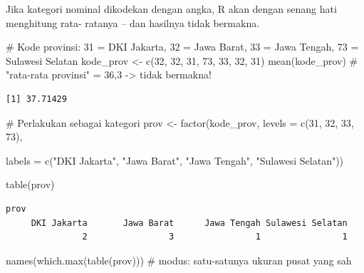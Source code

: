 \documentclass[
  indonesian,
  letterpaper,
]{book}
\newenvironment{Shaded}{\begin{snugshade}}{\end{snugshade}}
\newcommand{\AttributeTok}[1]{\textcolor[rgb]{0.40,0.45,0.13}{#1}}
\newcommand{\CommentTok}[1]{\textcolor[rgb]{0.37,0.37,0.37}{#1}}
\newcommand{\DecValTok}[1]{\textcolor[rgb]{0.68,0.00,0.00}{#1}}
\newcommand{\FunctionTok}[1]{\textcolor[rgb]{0.28,0.35,0.67}{#1}}
\newcommand{\NormalTok}[1]{\textcolor[rgb]{0.00,0.23,0.31}{#1}}
\newcommand{\OtherTok}[1]{\textcolor[rgb]{0.00,0.23,0.31}{#1}}
\newcommand{\StringTok}[1]{\textcolor[rgb]{0.13,0.47,0.30}{#1}}
\begin{document}
Jika kategori nominal dikodekan dengan angka, R akan dengan senang hati
menghitung rata- ratanya -- dan hasilnya tidak bermakna.

\begin{Shaded}
\begin{Highlighting}[]
\CommentTok{\# Kode provinsi: 31 = DKI Jakarta, 32 = Jawa Barat, 33 = Jawa Tengah, 73 = Sulawesi Selatan}
\NormalTok{kode\_prov }\OtherTok{\textless{}{-}} \FunctionTok{c}\NormalTok{(}\DecValTok{32}\NormalTok{, }\DecValTok{32}\NormalTok{, }\DecValTok{31}\NormalTok{, }\DecValTok{73}\NormalTok{, }\DecValTok{33}\NormalTok{, }\DecValTok{32}\NormalTok{, }\DecValTok{31}\NormalTok{)}
\FunctionTok{mean}\NormalTok{(kode\_prov) }\CommentTok{\# "rata{-}rata provinsi" = 36,3 {-}\textgreater{} tidak bermakna!}
\end{Highlighting}
\end{Shaded}

\begin{verbatim}
[1] 37.71429
\end{verbatim}

\begin{Shaded}
\begin{Highlighting}[]
\CommentTok{\# Perlakukan sebagai kategori}
\NormalTok{prov }\OtherTok{\textless{}{-}} \FunctionTok{factor}\NormalTok{(kode\_prov, }\AttributeTok{levels =} \FunctionTok{c}\NormalTok{(}\DecValTok{31}\NormalTok{, }\DecValTok{32}\NormalTok{, }\DecValTok{33}\NormalTok{, }\DecValTok{73}\NormalTok{),}

\AttributeTok{labels =} \FunctionTok{c}\NormalTok{(}\StringTok{"DKI Jakarta"}\NormalTok{, }\StringTok{"Jawa Barat"}\NormalTok{, }\StringTok{"Jawa Tengah"}\NormalTok{, }\StringTok{"Sulawesi Selatan"}\NormalTok{))}

\FunctionTok{table}\NormalTok{(prov)}
\end{Highlighting}
\end{Shaded}

\begin{verbatim}
prov
     DKI Jakarta       Jawa Barat      Jawa Tengah Sulawesi Selatan 
               2                3                1                1 
\end{verbatim}

\begin{Shaded}
\begin{Highlighting}[]
\FunctionTok{names}\NormalTok{(}\FunctionTok{which.max}\NormalTok{(}\FunctionTok{table}\NormalTok{(prov))) }\CommentTok{\# modus: satu{-}satunya ukuran pusat yang sah}
\end{Highlighting}
\end{Shaded}
\end{document}
